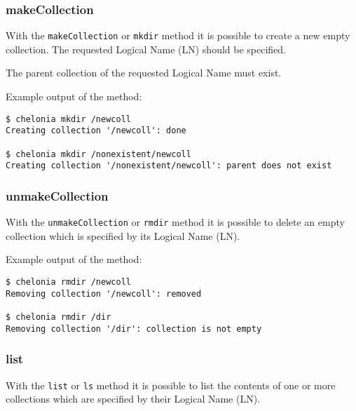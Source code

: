 \subsubsection{makeCollection} %
\label{ssub:makecollection}
With the \texttt{makeCollection} or \texttt{mkdir} method it is possible to create a new empty collection. The requested Logical Name (LN) should be specified.
\hspace*{0.5cm}
\begin{shaded}
\end{shaded}

The parent collection of the requested Logical Name must exist.

Example output of the method:
\begin{verbatim}
$ chelonia mkdir /newcoll
Creating collection '/newcoll': done

$ chelonia mkdir /nonexistent/newcoll
Creating collection '/nonexistent/newcoll': parent does not exist
\end{verbatim}

\subsubsection{unmakeCollection} %
\label{ssub:unmakecollection}
With the \texttt{unmakeCollection} or \texttt{rmdir} method it is possible to delete an empty collection which is specified by its Logical Name (LN).
\hspace*{0.5cm}
\begin{shaded}
\end{shaded}

Example output of the method:
\begin{verbatim}
$ chelonia rmdir /newcoll
Removing collection '/newcoll': removed

$ chelonia rmdir /dir
Removing collection '/dir': collection is not empty
\end{verbatim}

\subsubsection{list} %
\label{ssub:list}
With the \texttt{list} or \texttt{ls} method it is possible to list the contents of one or more collections which are specified by their Logical Name (LN).
\hspace*{0.5cm}
\begin{shaded}
\end{shaded}

